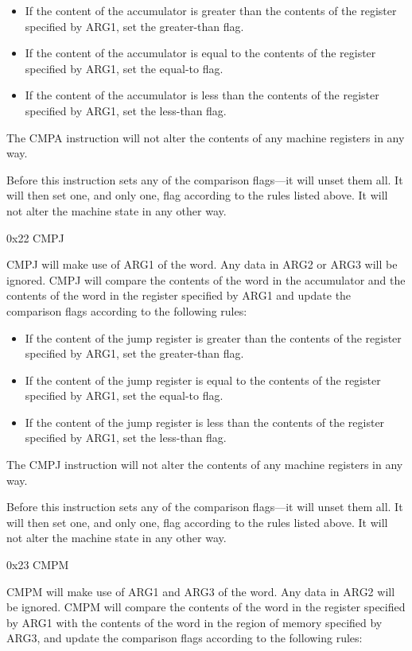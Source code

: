 \documentclass[]{article}
\providecommand{\tightlist}{%
  \setlength{\itemsep}{0pt}\setlength{\parskip}{0pt}}
\begin{document}
\begin{itemize}
\tightlist
\item
  If the content of the accumulator is greater than the contents of the
  register specified by ARG1, set the greater-than flag.
\item
  If the content of the accumulator is equal to the contents of the
  register specified by ARG1, set the equal-to flag.
\item
  If the content of the accumulator is less than the contents of the
  register specified by ARG1, set the less-than flag.
\end{itemize}

The CMPA instruction will not alter the contents of any machine
registers in any way.

Before this instruction sets any of the comparison flags---it will unset
them all. It will then set one, and only one, flag according to the
rules listed above. It will not alter the machine state in any other
way.

0x22 CMPJ

CMPJ will make use of ARG1 of the word. Any data in ARG2 or ARG3 will be
ignored. CMPJ will compare the contents of the word in the accumulator
and the contents of the word in the register specified by ARG1 and
update the comparison flags according to the following rules:

\begin{itemize}
\tightlist
\item
  If the content of the jump register is greater than the contents of
  the register specified by ARG1, set the greater-than flag.
\item
  If the content of the jump register is equal to the contents of the
  register specified by ARG1, set the equal-to flag.
\item
  If the content of the jump register is less than the contents of the
  register specified by ARG1, set the less-than flag.
\end{itemize}

The CMPJ instruction will not alter the contents of any machine
registers in any way.

Before this instruction sets any of the comparison flags---it will unset
them all. It will then set one, and only one, flag according to the
rules listed above. It will not alter the machine state in any other
way.

0x23 CMPM

CMPM will make use of ARG1 and ARG3 of the word. Any data in ARG2 will
be ignored. CMPM will compare the contents of the word in the register
specified by ARG1 with the contents of the word in the region of memory
specified by ARG3, and update the comparison flags according to the
following rules:
\end{document}
